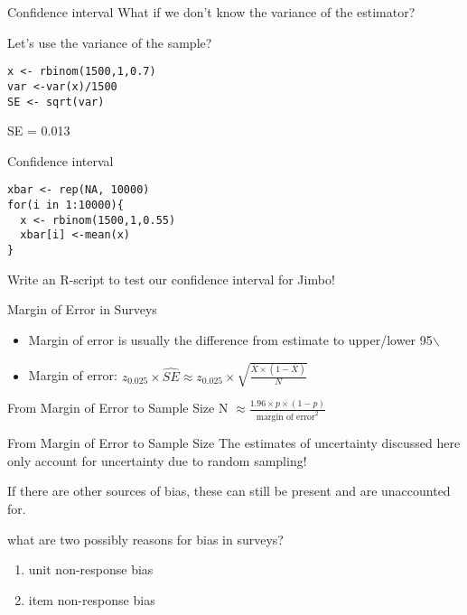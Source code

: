 \documentclass[presentation]{beamer}
\begin{document}
\begin{frame}[fragile,label={sec:org36487eb}]{Confidence interval}
 What if we don't know the variance of the estimator?

Let's use the variance of the sample?

\begin{verbatim}
x <- rbinom(1500,1,0.7)
var <-var(x)/1500
SE <- sqrt(var)
\end{verbatim}

SE = 0.013
\end{frame}


\begin{frame}[fragile,label={sec:org2dbcdc0}]{Confidence interval}
 \begin{verbatim}
xbar <- rep(NA, 10000)
for(i in 1:10000){
  x <- rbinom(1500,1,0.55)
  xbar[i] <-mean(x)
}
\end{verbatim}

Write an R-script to test our confidence interval for Jimbo!
\end{frame}


\begin{frame}[label={sec:org5418df0}]{Margin of Error in Surveys}
\begin{itemize}
\item Margin of error is usually the difference from estimate to upper/lower 95$\backslash$%

\item Margin of error: \(z_{0.025} \times \hat{SE} \approx  z_{0.025} \times \sqrt{\frac{\overline{X} \times (1-\overline{X})}{N}}\)
\end{itemize}
\end{frame}


\begin{frame}[label={sec:org2980367}]{From Margin of Error to Sample Size}
N \(\approx \frac{1.96 \times p \times (1-p)}{\text{margin of error}^{2}}\)
\end{frame}


\begin{frame}[label={sec:org5b057c2}]{From Margin of Error to Sample Size}
The estimates of uncertainty discussed here only account for uncertainty due to random sampling!

If there are other sources of bias, these can still be present and are unaccounted for.

\alert{what are two possibly reasons for bias in surveys?}

\pause

\begin{enumerate}
\item unit non-response bias
\item item non-response bias
\end{enumerate}
\end{frame}
\end{document}
